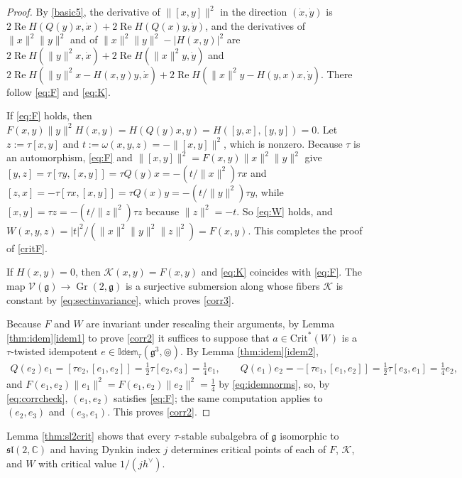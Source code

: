 \documentclass[leqno,10pt]{amsart}
\theoremstyle{definition}
\numberwithin{equation}{section}
\newcommand{\grass}{\operatorname{Gr}}
\newcommand{\sect}{\mathscr{K}}
\newcommand{\idem}{\mathbb{Idem}}
\newcommand{\tmlt}{\circledcirc}
\newcommand{\om}{\omega}
\newcommand{\re}{\operatorname{Re}}
\newcommand{\sll}{\mathfrak{sl}}
\newcommand{\g}{\mathfrak{g}}
\newcommand{\stiefel}{\mathscr{V}}
\newcommand{\com}{\mathbb C}
\newcommand{\crtnt}{\mathrm{Crit}^*}
\newcommand{\hv}{h^\vee}
\newcommand{\norm}[1]{\lVert #1\rVert}
\newcommand{\qad}{Q}
\begin{document}
\begin{proof}
By \eqref{basic5}, the derivative of $\norm{[x, y]}^{2}$ in the direction $(\dot{x}, \dot{y})$ is $2\re H(\qad(y)x, \dot{x}) + 2\re H(\qad(x)y, \dot{y})$, and the derivatives of $\norm{x}^{2}\norm{y}^{2}$ and of $\norm{x}^{2}\norm{y}^{2} - |H(x, y)|^{2}$ are $2\re H(\norm{y}^{2}x, \dot{x}) + 2\re H(\norm{x}^{2}y, \dot{y})$ and $2\re H(\norm{y}^{2}x - H(x, y)y, \dot{x}) + 2\re H(\norm{x}^{2}y - H(y, x)x, \dot{y})$. There follow \eqref{eq:F} and \eqref{eq:K}. 

If \eqref{eq:F} holds, then $F(x, y)\norm{y}^{2}H(x, y) = H(\qad(y)x, y) = H([y, x], [y, y]) = 0$. Let $z := \tau[x, y]$ and $t := \om(x, y, z) = -\norm{[x, y]}^{2}$, which is nonzero. Because $\tau$ is an automorphism, \eqref{eq:F} and $\norm{[x, y]}^{2} = F(x, y)\norm{x}^{2}\norm{y}^{2}$ give $[y, z] = \tau[\tau y, [x, y]] = \tau\qad(y)x = -(t/\norm{x}^{2})\tau x$ and $[z, x] = -\tau[\tau x, [x, y]] = \tau\qad(x)y = -(t/\norm{y}^{2})\tau y$, while $[x, y] = \tau z = -(t/\norm{z}^{2})\tau z$ because $\norm{z}^{2} = -t$. So \eqref{eq:W} holds, and $W(x, y, z) = |t|^{2}/(\norm{x}^{2}\norm{y}^{2}\norm{z}^{2}) = F(x, y)$. This completes the proof of \ref{critF}.

If $H(x, y) = 0$, then $\sect(x, y) = F(x, y)$ and \eqref{eq:K} coincides with \eqref{eq:F}. The map $\stiefel(\g) \to \grass(2, \g)$ is a surjective submersion along whose fibers $\sect$ is constant by \eqref{eq:sectinvariance}, which proves \ref{corr3}.

Because $F$ and $W$ are invariant under rescaling their arguments, by Lemma \ref{thm:idem}\ref{idem1} to prove \ref{corr2} it suffices to suppose that $a \in \crtnt(W)$ is a $\tau$-twisted idempotent $e \in \idem_{\tau}(\g^{3}, \tmlt)$. By Lemma \ref{thm:idem}\ref{idem2}, 
\begin{align}\label{eq:corrcheck}
\qad(e_{2})e_{1} = [\tau e_{2}, [e_{1}, e_{2}]] = \tfrac{1}{2}\tau[e_{2}, e_{3}] = \tfrac{1}{4}e_{1}, \qquad \qad(e_{1})e_{2} = -[\tau e_{1}, [e_{1}, e_{2}]] = \tfrac{1}{2}\tau[e_{3}, e_{1}] = \tfrac{1}{4}e_{2},
\end{align}
and $F(e_{1}, e_{2})\norm{e_{1}}^{2} = F(e_{1}, e_{2})\norm{e_{2}}^{2} = \tfrac{1}{4}$ by \eqref{eq:idemnorms}, so, by \eqref{eq:corrcheck}, $(e_{1}, e_{2})$ satisfies \eqref{eq:F}; the same computation applies to $(e_{2}, e_{3})$ and $(e_{3}, e_{1})$. This proves \ref{corr2}.
\end{proof}

Lemma \ref{thm:sl2crit} shows that every $\tau$-stable subalgebra of $\g$ isomorphic to $\sll(2, \com)$ and having Dynkin index $j$ determines critical points of each of $F$, $\sect$, and $W$ with critical value $1/(j\hv)$. 
\end{document}
